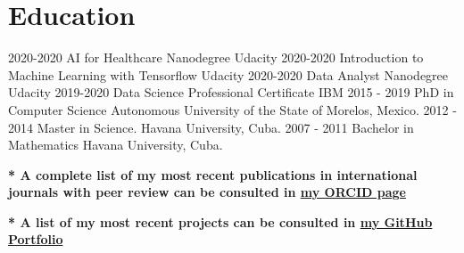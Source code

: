 \documentclass[]{friggeri-cv}
\begin{document}
\section{Education}
\begin{entrylist}\vspace{-.1in}
\entry
    {2020-2020}
    { AI for Healthcare Nanodegree}
    {Udacity}  {}\vspace{-.1in}
    \entry
    {2020-2020}
    { Introduction to Machine Learning with Tensorflow}
    {Udacity}  {}\vspace{-.1in}
    \entry
    {2020-2020}
    { Data Analyst Nanodegree}
    {Udacity}  {}\vspace{-.1in}
\entry
    {2019-2020}
    { Data Science Professional Certificate}
    {IBM}  {}\vspace{-.1in}
\entry  
    {2015 - 2019}
    {PhD in Computer Science}
    {Autonomous University of the State of Morelos, Mexico.}  {}\vspace{-.1in}
  \entry
    {2012 - 2014}
    {Master in Science.}
    {Havana University, Cuba.}{}
  \entry
    {2007 - 2011}
    {Bachelor in Mathematics}
    {Havana University,
    Cuba.}
     {}
\end{entrylist}

\textbf{* A complete list of my most recent publications in international journals with peer review can be  consulted in \href{https://orcid.org/0000-0001-6005-0702/}{my ORCID page}}

\textbf{* A  list of my most recent projects  can be  consulted in  \href{https://claudia-perez-ruisanchez.github.io/portfolio}{my GitHub Portfolio}}
\end{document}
